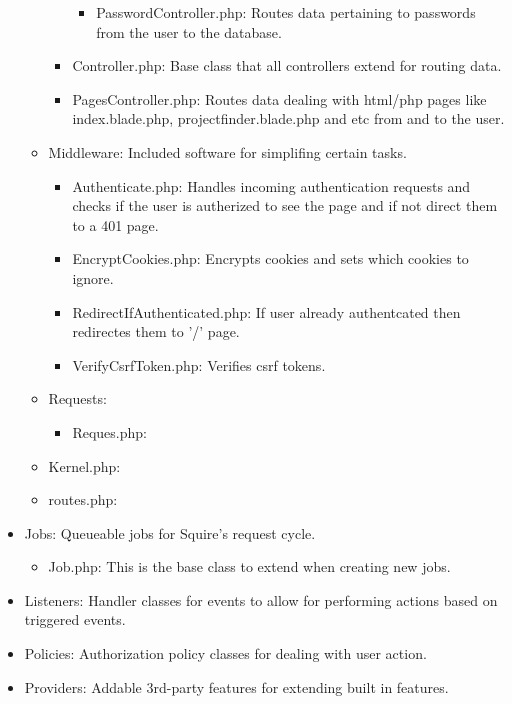 \begin{itemize}
\begin{itemize}
\begin{itemize}
\begin{itemize}
                \item PasswordController.php: Routes data pertaining to passwords from the user to the database.
            \end{itemize}
            \item Controller.php: Base class that all controllers extend for routing data.
            \item PagesController.php: Routes data dealing with html/php pages like index.blade.php, projectfinder.blade.php and etc from and to the user.
        \end{itemize}
        \item Middleware: Included software for simplifing certain tasks.
        \begin{itemize}
            \item Authenticate.php: Handles incoming authentication requests and checks if the user is autherized to see the page and if not direct them to a 401 page.
            \item EncryptCookies.php: Encrypts cookies and sets which cookies to ignore.
            \item RedirectIfAuthenticated.php: If user already authentcated then redirectes them to '/' page.
            \item VerifyCsrfToken.php: Verifies csrf tokens.
        \end{itemize}
        \item Requests: 
        \begin{itemize}
            \item Reques.php: 
        \end{itemize}
        \item Kernel.php: 
        \item routes.php: 
    \end{itemize}
    \item Jobs: Queueable jobs for Squire’s request cycle.
    \begin{itemize}
        \item Job.php: This is the base class to extend when creating new jobs.
    \end{itemize}
    \item Listeners: Handler classes for events to allow for performing actions based on triggered events.
    \item Policies: Authorization policy classes for dealing with user action.
    \item Providers: Addable 3rd-party features for extending built in features.

\end{itemize}
